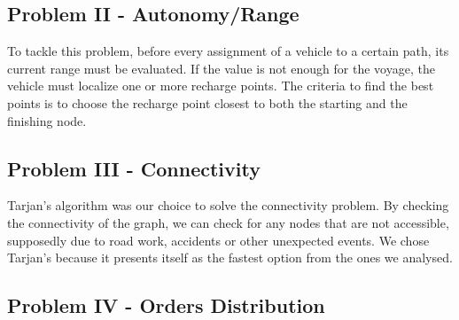 \subsection{Problem II - Autonomy/Range}
To tackle this problem, before every assignment of a vehicle to a certain path, its current range must be evaluated. If the value is not enough for the voyage, the vehicle must localize one or more recharge points. The criteria to find the best points is to choose the recharge point closest to both the starting and the finishing node. 

\subsection{Problem III - Connectivity}
Tarjan's algorithm was our choice to solve the connectivity problem. By checking the connectivity of the graph, we can check for any nodes that are not accessible, supposedly due to road work, accidents or other unexpected events. We chose Tarjan's because it presents itself as the fastest option from the ones we analysed.

\subsection{Problem IV - Orders Distribution}










